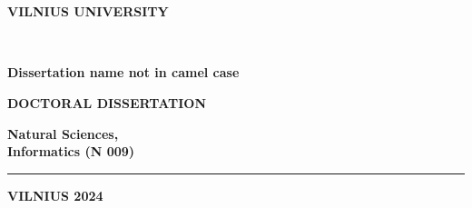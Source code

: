 \thispagestyle{empty}                   %
{\selectfont
\renewcommand\bfdefault{bc}%
\selectfont

\begin{flushright}
\thesisDOI \\
\thesisORCID \\ 
\end{flushright}
\begin{center}

	\vspace*{5mm}	
	\begin{flushleft}
\renewcommand\bfdefault{bc}
\bf \large
	VILNIUS UNIVERSITY \\
	\end{flushleft}
	
	
	\vspace{50mm}
	\begin{flushleft}
	{\Large \bf  \thesisAuthorName  \\ \MakeUppercase{\thesisAuthorSurname} \par}
    \end{flushleft}

	\vspace{10mm}
	\begin{flushleft}
	{\huge \bf
\fontsize{21}{21}\selectfont
	Dissertation name not in camel case \par
	}
    \end{flushleft}

    \vspace{5mm}
\begin{flushleft}
\renewcommand\bfdefault{b}
  {\bf DOCTORAL DISSERTATION}\\%
\end{flushleft}
  \vspace{15mm}
  \begin{flushleft}
\renewcommand\bfdefault{bc}
\bf
  Natural Sciences, \\
  Informatics (N 009)
  \end{flushleft}
     \begin{flushleft} 
  		\noindent\rule{3cm}{0.4pt}
     \end{flushleft} 
   \begin{flushleft} \bf
  VILNIUS 2024
   \end{flushleft} 
\end{center}
}
\newpage
\thispagestyle{empty}                   %

